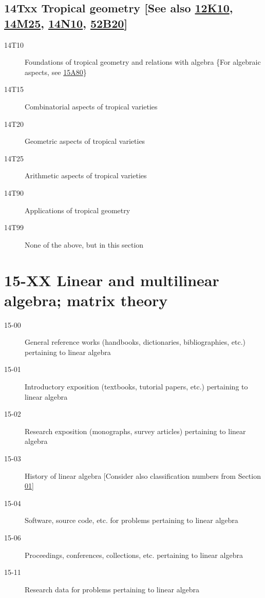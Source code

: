 \documentclass[letterpaper]{article}
\begin{document}
\subsection*{14Txx Tropical geometry [See also \hyperref[12K10]{12K10}, \hyperref[14M25]{14M25}, \hyperref[14N10]{14N10}, \hyperref[52B20]{52B20}] }\label{14Txx}
\begin{description}     
\item [14T10]\label{14T10} Foundations of tropical geometry and relations with algebra \{For algebraic aspects, see \hyperref[15A80]{15A80}\}
\item [14T15]\label{14T15} Combinatorial aspects of tropical varieties
\item [14T20]\label{14T20} Geometric aspects of tropical varieties
\item [14T25]\label{14T25} Arithmetic aspects of tropical varieties
\item [14T90]\label{14T90} Applications of tropical geometry
\item [14T99]\label{14T99} None of the above, but in this section
\end{description}          
\section*{15-XX Linear and multilinear algebra; matrix theory }\label{15-XX}
\begin{description}
\item [15-00]\label{15-00} General reference works (handbooks, dictionaries, bibliographies, etc.) pertaining to linear algebra
\item [15-01]\label{15-01} Introductory exposition (textbooks, tutorial papers, etc.) pertaining to linear algebra
\item [15-02]\label{15-02} Research exposition (monographs, survey articles) pertaining to linear algebra
\item [15-03]\label{15-03} History of linear algebra [Consider also classification numbers from Section \hyperref[01-XX]{01}]
\item [15-04]\label{15-04} Software, source code, etc. for problems pertaining to linear algebra
\item [15-06]\label{15-06} Proceedings, conferences, collections, etc. pertaining to linear algebra
\item [15-11]\label{15-11} Research data for problems pertaining to linear algebra
\end{description}
\end{document}
